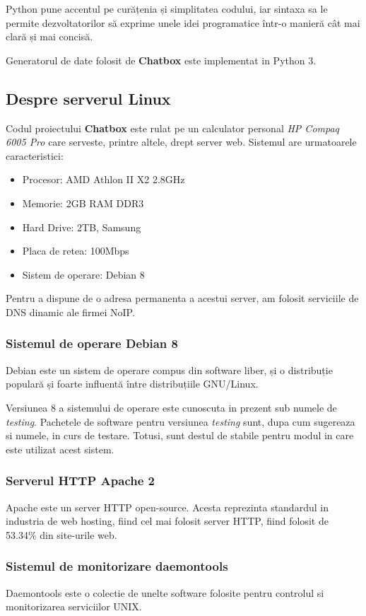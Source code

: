\documentclass[12pt,a4paper]{article}
\begin{document}
Python pune accentul pe curățenia și simplitatea codului, iar sintaxa sa le permite dezvoltatorilor să exprime unele idei programatice într-o manieră cât mai clară și mai concisă.

Generatorul de date folosit de \textbf{Chatbox} este implementat in Python 3.

\subsection{Despre serverul Linux}
Codul proiectului \textbf{Chatbox} este rulat pe un calculator personal
 \textit{HP Compaq 6005 Pro}
care serveste, printre altele, drept server web. 
Sistemul are urmatoarele caracteristici:
\begin{itemize}
  \item Procesor: AMD Athlon II X2 2.8GHz
  \item Memorie: 2GB RAM DDR3
  \item Hard Drive: 2TB, Samsung
  \item Placa de retea: 100Mbps
  \item Sistem de operare: Debian 8
\end{itemize}

Pentru a dispune de o adresa permanenta a acestui server, 
am folosit serviciile de DNS dinamic ale firmei NoIP\cite{noip}.

\subsubsection{Sistemul de operare Debian 8}
Debian\cite{debian} este un sistem de operare compus din software liber\cite{free}, și o distribuție populară și foarte influentă între distribuțiile GNU/Linux.

Versiunea 8 a sistemului de operare este cunoscuta in prezent sub 
numele de \textit{testing}. Pachetele de software pentru versiunea 
\textit{testing} sunt, dupa cum sugereaza si numele, in curs de testare.
Totusi, sunt destul de stabile pentru modul in care 
este utilizat acest sistem.

\subsubsection{Serverul HTTP Apache 2}
Apache este un server HTTP open-source. Acesta reprezinta standardul in 
industria de web hosting, fiind cel mai folosit server HTTP, fiind folosit de 
53.34\% din site-urile web\cite{apache53}.

\subsubsection{Sistemul de monitorizare daemontools}
Daemontools\cite{daemon} este o colectie de unelte software folosite pentru 
controlul si monitorizarea serviciilor UNIX. 
\end{document}

